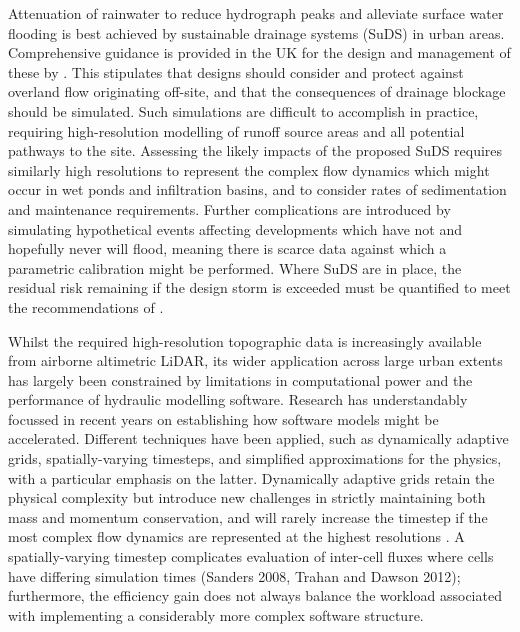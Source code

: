 \documentclass[11pt,english,a4paper]{article}
\begin{document}
Attenuation of rainwater to reduce hydrograph peaks and alleviate surface water flooding is best achieved by sustainable drainage systems (SuDS) in urban areas. Comprehensive guidance is provided in the UK for the design and management of these by \citet{Woods-Ballard2007}. This stipulates that designs should consider and protect against overland flow originating off-site, and that the consequences of drainage blockage should be simulated. Such simulations are difficult to accomplish in practice, requiring high-resolution modelling of runoff source areas and all potential pathways to the site. Assessing the likely impacts of the proposed SuDS requires similarly high resolutions to represent the complex flow dynamics which might occur in wet ponds and infiltration basins, and to consider rates of sedimentation and maintenance requirements. Further complications are introduced by simulating hypothetical events affecting developments which have not and hopefully never will flood, meaning there is scarce data against which a parametric calibration might be performed. Where SuDS are in place, the residual risk remaining if the design storm is exceeded must be quantified to meet the recommendations of \citet{Pitt2007}.

Whilst the required high-resolution topographic data is increasingly available from airborne altimetric LiDAR, its wider application across large urban extents has largely been constrained by limitations in computational power and the performance of hydraulic modelling software. Research has understandably focussed in recent years on establishing how software models might be accelerated. Different techniques have been applied, such as dynamically adaptive grids, spatially-varying timesteps, and simplified approximations for the physics, with a particular emphasis on the latter. Dynamically adaptive grids retain the physical complexity but introduce new challenges in strictly maintaining both mass and momentum conservation, and will rarely increase the timestep if the most complex flow dynamics are represented at the highest resolutions \citep[e.g.][]{Liang2008,Kubatko2009}. A spatially-varying timestep complicates evaluation of inter-cell fluxes where cells have differing simulation times (Sanders 2008, Trahan and Dawson 2012); furthermore, the efficiency gain does not always balance the workload associated with implementing a considerably more complex software structure. 
\end{document}
